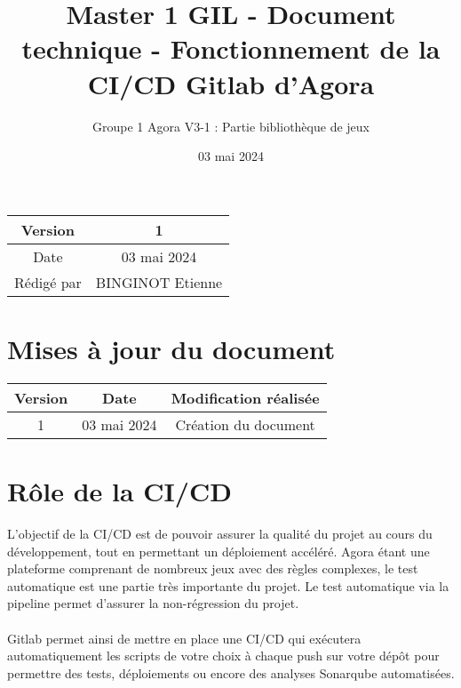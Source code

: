 \documentclass{article}
\title{Master 1 GIL - Document technique - Fonctionnement de la \\
        CI/CD Gitlab d'Agora}
\author{Groupe 1 Agora V3-1 : Partie bibliothèque de jeux}
\date{03 mai 2024}
\begin{document}
\maketitle
    \begin{center}
        \begin{tabular}{|| c | c ||}
                \hline 
                Version & 1 \\
                \hline 
                Date & 03 mai 2024 \\
                \hline
                Rédigé par & BINGINOT Etienne\\
                \hline
        \end{tabular}
    \end{center}

    \newpage
    \section*{Mises à jour du document}

    \begin{center}
        \begin{tabular}{|| c | c | c ||}
                \hline 
                Version & Date & Modification réalisée \\
                \hline
                \hline 
                1 & 03 mai 2024 & Création du document \\
                \hline
        \end{tabular}
    \end{center}

    \newpage
    \tableofcontents
    \newpage

    \section{Rôle de la CI/CD}

        L'objectif de la CI/CD est de pouvoir assurer la qualité du projet au cours du développement, tout en permettant un déploiement accéléré. Agora étant une plateforme comprenant de nombreux jeux avec des règles complexes, le test automatique est une partie très importante du projet. Le test automatique via la pipeline permet d'assurer la non-régression du projet.\\
        \\
        Gitlab permet ainsi de mettre en place une CI/CD qui exécutera automatiquement les scripts de votre choix à chaque push sur votre dépôt pour permettre des tests, déploiements ou encore des analyses Sonarqube automatisées.\\
\end{document}

